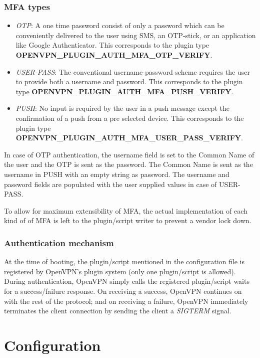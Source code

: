 \documentclass[11pt,oneside]{book}
\begin{document}
\subsubsection{MFA types}
\begin{itemize}
    \item \emph{OTP}: A one time password consist of only a password which can be conveniently
        delivered to the user using SMS, an OTP-stick, or an application like Google Authenticator.
        This corresponds to the plugin type\\
        \textbf{OPENVPN\_PLUGIN\_AUTH\_MFA\_OTP\_VERIFY}.
    \item \emph{USER-PASS}: The conventional username-password scheme requires the user to provide
        both a username and password.
        This corresponds to the plugin type \textbf{OPENVPN\_PLUGIN\_AUTH\_MFA\_PUSH\_VERIFY}.
    \item \emph{PUSH}: No input is required by the user in a push message except the confirmation
        of a push from a pre selected device.
        This corresponds to the plugin type \textbf{OPENVPN\_PLUGIN\_AUTH\_MFA\_USER\_PASS\_VERIFY}.
\end{itemize}

In case of OTP authentication, the username field is set to the Common Name of the user and the OTP
is sent as the password. The Common Name is sent as the username in PUSH with an empty string as
password. The username and password fields are populated with the user supplied values in case of
USER-PASS.

To allow for maximum extensibility of MFA, the actual implementation of each kind of of MFA
is left to the plugin/script writer to prevent a vendor lock down.

\subsubsection{Authentication mechanism}
\label{MFA:Mechanism}
At the time of booting, the plugin/script mentioned in the configuration file is registered
by OpenVPN's plugin system (only one plugin/script is allowed). During authentication, OpenVPN
simply calls the registered plugin/script waits for a success/failure response. On receiving a
success, OpenVPN continues on with the rest of the protocol; and on receiving a failure, OpenVPN
immediately terminates the client connection by sending the client a \emph{SIGTERM} signal.

\section{Configuration}
\end{document}
